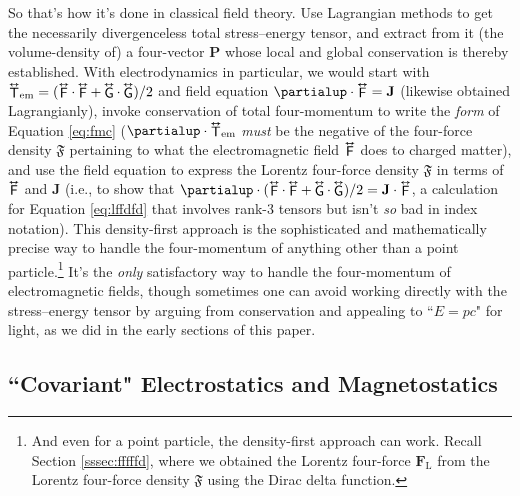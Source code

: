 \documentclass[12pt]{article}
\renewcommand{\vv}[1]{\mathbf{#1}}
\newcommand{\tightoverset}[2]{%
  \mathop{#2}\limits^{\vbox to -.5ex{\kern-0.75ex\hbox{$#1$}\vss}}}
\newcommand{\inlinedy}[1]{\tightoverset{\text{\tiny$\bm\leftrightarrow$}}{#1}}
\begin{document}
So that's how it's done in classical field theory. Use Lagrangian methods to get the necessarily divergenceless total stress--energy tensor, and extract from it (the volume-density of) a four-vector $\vv P$ whose local and global conservation is thereby established. With electrodynamics in particular, we would start with ${\inlinedy{\mathsf{T}}}_{\textrm{em}} = ( \inlinedy{\mathsf{F}} \cdot \inlinedy{\mathsf{F}} + \inlinedy{\mathsf{G}} \cdot \inlinedy{\mathsf{G}} ) / 2$ and field equation $\partialup \cdot \inlinedy{\mathsf{F}} = \vv J$ (likewise obtained Lagrangianly), invoke conservation of total four-momentum to write the \emph{form} of Equation \ref{eq:fmc} ($\partialup \cdot {\inlinedy{\mathsf{T}}}_{\textrm{em}}$ \emph{must} be the negative of the four-force density $\bm{\mathfrak{F}}$ pertaining to what the electromagnetic field $\inlinedy{\mathsf{F}}$ does to charged matter), and use the field equation to express the Lorentz four-force density $\bm{\mathfrak{F}}$ in terms of $\inlinedy{\mathsf{F}}$ and $\vv J$ (i.e., to show that $\partialup \cdot ( \inlinedy{\mathsf{F}} \cdot \inlinedy{\mathsf{F}} + \inlinedy{\mathsf{G}} \cdot \inlinedy{\mathsf{G}} ) / 2 = \vv J \cdot \inlinedy{\mathsf{F}}$, a calculation for Equation \ref{eq:lffdfd} that involves rank-3 tensors but isn't \emph{so} bad in index notation). This density-first approach is the sophisticated and mathematically precise way to handle the four-momentum of anything other than a point particle.\footnote{And even for a point particle, the density-first approach can work. Recall Section \ref{sssec:fffffd}, where we obtained the Lorentz four-force $\vv F_{\mathrm{L}}$ from the Lorentz four-force density $\bm{\mathfrak{F}}$ using the Dirac delta function.} It's the \emph{only} satisfactory way to handle the four-momentum of electromagnetic fields, though sometimes one can avoid working directly with the stress--energy tensor by arguing from conservation and appealing to ``$E = pc$" for light, as we did in the early sections of this paper.


\subsection[“Covariant” Electrostatics and Magnetostatics]{``Covariant" Electrostatics and Magnetostatics}\label{ssec:covstatics}
\end{document}
